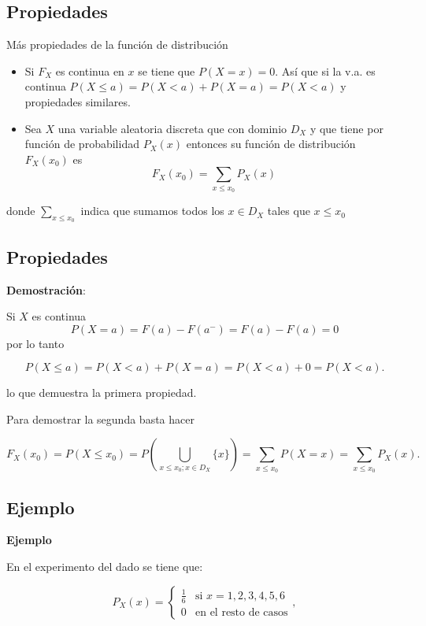 \documentclass[]{book}
\providecommand{\tightlist}{%
  \setlength{\itemsep}{0pt}\setlength{\parskip}{0pt}}
\begin{document}
\hypertarget{propiedades-16}{%
\subsection{Propiedades}\label{propiedades-16}}

Más propiedades de la función de distribución

\begin{itemize}
\tightlist
\item
  Si \(F_X\) es continua en \(x\) se tiene que \(P(X=x)=0\).
  Así que si la v.a. es continua \(P(X\leq a)=P(X< a)+P(X=a)=P(X<a)\) y propiedades similares.
\item
  Sea \(X\) una variable aleatoria discreta que con dominio \(D_X\) y
  que tiene por función de probabilidad \(P_{X}(x)\) entonces su función de distribución
  \(F_{X}(x_0)\) es
  \[F_{X}(x_0)=\sum_{x\leq x_0} P_{X}(x)\]
\end{itemize}

donde \(\sum_{x\leq x_0}\) indica que sumamos todos los \(x \in D_X\) tales que \(x\leq x_0\)

\hypertarget{propiedades-17}{%
\subsection{Propiedades}\label{propiedades-17}}

\textbf{Demostración}:

Si \(X\) es continua \[P(X=a)=F(a)-F(a^{-})=F(a)-F(a)=0\]
por lo tanto

\[P(X\leq a)=P(X<a)+P(X=a)= P(X<a)+0= P(X<a).\]

lo que demuestra la primera propiedad.

Para demostrar la segunda basta hacer

\[ 
F_{X}(x_0)= P(X\leq x_0)=P\left(\bigcup_{x\leq
x_0; x\in D_X} \{x\}\right)= \sum_{x\leq x_0}P(X=x)= \sum_{x\leq x_0}P_{X}(x).
\]

\hypertarget{ejemplo-11}{%
\subsection{Ejemplo}\label{ejemplo-11}}

\textbf{Ejemplo}

En el experimento del dado se tiene que:

\[P_{X}(x)=\left\{\begin{array}{ll} \frac16 & \mbox{si } x=1,2,3,4,5,6\\ 0 & \mbox{en el resto de casos}\end{array}\right.,\]
\end{document}

